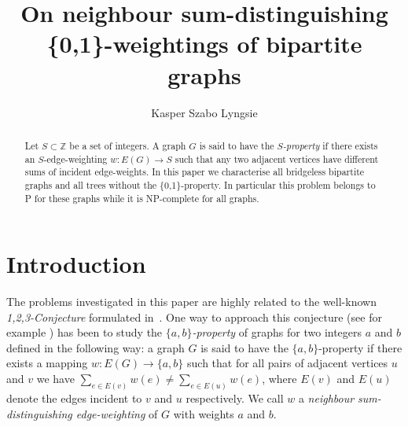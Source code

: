 \documentclass[
final,
 nomarks,
]{dmtcs-episciences}
\author{Kasper Szabo Lyngsie\affiliationmark{1}}
\title{On neighbour sum-distinguishing \{0,1\}-weightings of bipartite graphs}
\affiliation{
  Technical University of Denmark, Denmark}
\theoremstyle{definition}
\begin{document}
\maketitle
\begin{abstract}
   Let $S \subset \mathbb{Z}$ be a set of integers. A graph $G$ is said to have the \emph{$S$-property} if there exists an $S$-edge-weighting $w: E(G) \rightarrow S$ such that any two adjacent vertices have different sums of incident edge-weights. In this paper we characterise all bridgeless bipartite graphs and all trees without the \{0,1\}-property. In particular this problem belongs to \textsf{P} for these graphs while it is \textsf{NP}-complete for all graphs. 
\end{abstract}

\section{Introduction}
The problems investigated in this paper are highly related to the well-known \emph{1,2,3-Conjecture} formulated in~\cite{KaLuTh}. One way to approach this conjecture (see for example \cite{kha}) has been to study the \textit{$\{a,b\}$-property} of graphs for two integers $a$ and $b$ defined in the following way: a graph $G$ is said to have the $\{a,b\}$-property if there exists a mapping $w: E(G) \rightarrow \{a,b\}$ such that for all pairs of adjacent vertices $u$ and $v$ we have $\sum_{e \in E(v)}w(e) \neq \sum_{e \in E(u)}w(e)$, where $E(v)$ and $E(u)$ denote the edges incident to $v$ and $u$ respectively. We call $w$ a \textit{neighbour sum-distinguishing edge-weighting} of $G$ with weights $a$ and $b$.  \\
\end{document}
